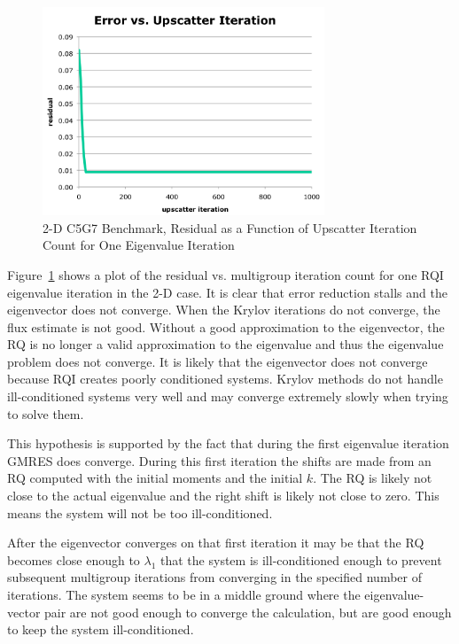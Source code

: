 \begin{figure}[!ht]	
  \begin{center}
    \includegraphics [width=0.75\textwidth, height=0.4\textheight ] {RQIConvergenceFail}
  \end{center}
  \caption{2-D C5G7 Benchmark, Residual as a Function of Upscatter Iteration Count for One Eigenvalue Iteration}
  \label{fig:RQIConvergenceFail}
\end{figure}
%
Figure~\ref{fig:RQIConvergenceFail} shows a plot of the residual vs. multigroup iteration count for one RQI eigenvalue iteration in the 2-D case. It is clear that error reduction stalls and the eigenvector does not converge. When the Krylov iterations do not converge, the flux estimate is not good. Without a good approximation to the eigenvector, the RQ is no longer a valid approximation to the eigenvalue and thus the eigenvalue problem does not converge. It is likely that the eigenvector does not converge because RQI creates poorly conditioned systems. Krylov methods do not handle ill-conditioned systems very well and may converge extremely slowly when trying to solve them. 

This hypothesis is supported by the fact that during the first eigenvalue iteration GMRES does converge. During this first iteration the shifts are made from an RQ computed with the initial moments and the initial $k$. The RQ is likely not close to the actual eigenvalue and the right shift is likely not close to zero. This means the system will not be too ill-conditioned. 

After the eigenvector converges on that first iteration it may be that the RQ becomes close enough to $\lambda_{1}$ that the system is ill-conditioned enough to prevent subsequent multigroup iterations from converging in the specified number of iterations. The system seems to be in a middle ground where the eigenvalue-vector pair are not good enough to converge the calculation, but are good enough to keep the system ill-conditioned. 

